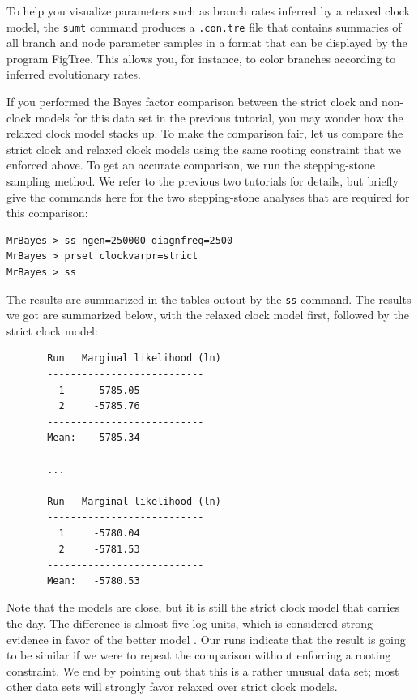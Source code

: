 \documentclass[12pt]{book}
\newcommand{\ttt}[1]{\texttt{#1} }
\begin{document}
To help you visualize parameters such as branch rates inferred by a relaxed clock model, the
\ttt{sumt} command produces a \ttt{.con.tre} file that contains summaries of all branch and node
parameter samples in a format that can be displayed by the program FigTree. This allows you, for
instance, to color branches according to inferred evolutionary rates.

If you performed the Bayes factor comparison between the strict clock and non-clock models for this
data set in the previous tutorial, you may wonder how the relaxed clock model stacks up. To make
the comparison fair, let us compare the strict clock and relaxed clock models using the same
rooting constraint that we enforced above. To get an accurate comparison, we run the stepping-stone
sampling method. We refer to the previous two tutorials for details, but briefly give the commands
here for the two stepping-stone analyses that are required for this comparison:

\begin{verbatim}
MrBayes > ss ngen=250000 diagnfreq=2500
MrBayes > prset clockvarpr=strict
MrBayes > ss
\end{verbatim}

The results are summarized in the tables outout by the \texttt{ss} command. The results we got are
summarized below, with the relaxed clock model first, followed by the strict clock model:

\footnotesize
\begin{singlespacing}
\begin{verbatim}
       Run   Marginal likelihood (ln)
       ---------------------------
         1     -5785.05   
         2     -5785.76   
       ---------------------------
       Mean:   -5785.34
       
       ...
       
       Run   Marginal likelihood (ln)
       ---------------------------
         1     -5780.04   
         2     -5781.53   
       ---------------------------
       Mean:   -5780.53
\end{verbatim}
\end{singlespacing}
\normalsize

Note that the models are close, but it is still the strict clock model that carries the day. The
difference is almost five log units, which is considered strong evidence in favor of the better
model \cite{kass95}. Our runs indicate that the result is going to be similar if we were to repeat
the comparison without enforcing a rooting constraint. We end by pointing out that this is a rather
unusual data set; most other data sets will strongly favor relaxed over strict clock models.
\end{document}
